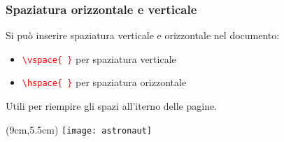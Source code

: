 \begin{frame}
  \frametitle{Spaziatura orizzontale e verticale}
  
  Si può inserire spaziatura verticale e orizzontale nel documento:
  \begin{itemize}
   \item \textcolor{red}{\texttt{\textbackslash vspace\{ \}}} per spaziatura 
verticale
   \item \textcolor{red}{\texttt{\textbackslash hspace\{ \}}} per spaziatura 
orizzontale
  \end{itemize}
  
  Utili per riempire gli spazi all'iterno delle pagine.
  
  
  \begin{textblock*}{5cm}(9cm,5.5cm)
   \texttt{[image: astronaut]}
 \end{textblock*}
 

\end{frame}
